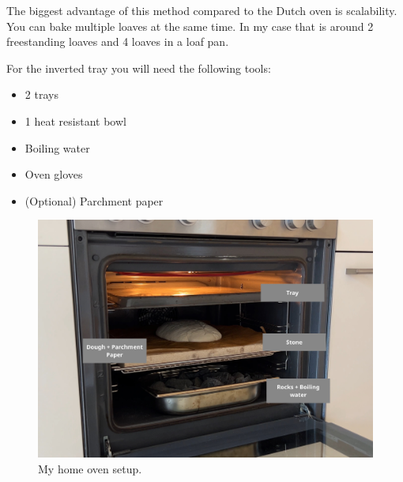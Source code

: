 The biggest advantage of this method compared to the
Dutch oven is scalability. You can bake multiple loaves
at the same time. In my case that is around 2 freestanding
loaves and 4 loaves in a loaf pan.

For the inverted tray you will need the following tools:
\begin{itemize}
\item 2 trays
\item 1 heat resistant bowl
\item Boiling water
\item Oven gloves
\item (Optional) Parchment paper
\end{itemize}

\begin{figure}[!htb]
  \includegraphics[width=\textwidth]{baking-example.jpg}
  \caption{My home oven setup.}
\end{figure}

